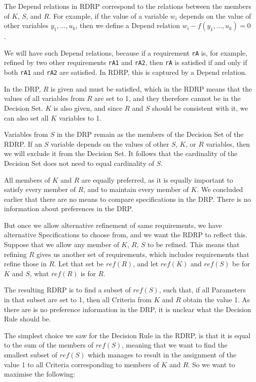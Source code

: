 \documentclass[graybox]{svmult}
\newcommand{\zi}[1]{\textit{#1}}
\newcommand{\xt}[1]{\texttt{#1}}
\newcommand{\req}[1]{\xt{#1}}
\newcommand{\ZJRP}{DRP}
\newcommand{\Specification}{Specification}
\newcommand{\Criteria}{Criteria}
\newcommand{\Parameter}{Parameter}
\newcommand{\Depend}{Depend}
\newcommand{\DecisionRule}{Decision Rule}
\newcommand{\DecisionSet}{Decision Set}
\newcommand{\ZJROP}{RDRP}
\begin{document}
The \Depend{} relations in \ZJROP{} correspond to the relations between the members of $K$, $S$, and $R$. For example, if the value of a variable $w_{i}$ depends on the value of other variables $y_{1}, \ldots, u_{k}$, then we define a \Depend{} relation $w_{i} - f(y_{1}, \ldots, u_{k}) = 0$. 

We will have such \Depend{} relations, because if a requirement \req{rA} is, for example, refined by two other requirements \req{rA1} and \req{rA2}, then \req{rA} is satisfied if and only if both \req{rA1} and \req{rA2} are satisfied. In \ZJROP, this is captured by a \Depend{} relation.

In the \ZJRP, $R$ is given and must be satisfied, which in the \ZJROP{} means that the values of all variables from $R$ are set to 1, and they therefore cannot be in the \DecisionSet. $K$ is also given, and since $R$ and $S$ should be consistent with it, we can also set all $K$ variables to 1. 

Variables from $S$ in the \ZJRP{} remain as the members of the \DecisionSet{} of the \ZJROP. If an $S$ variable depends on the values of other $S$, $K$, or $R$ variables, then we will exclude it from the \DecisionSet. It follows that the cardinality of the \DecisionSet{} does not need to equal cardinality of $S$.

All members of $K$ and $R$ are equally preferred, as it is equally important to satisfy every member of $R$, and to maintain every member of $K$. We concluded earlier that there are no means to compare specifications in the \ZJRP. There is no information about preferences in the \ZJRP.

But once we allow alternative refinement of same requirements, we have alternative \Specification s to choose from, and we want the \ZJROP{} to reflect this. Suppose that we allow any member of $K$, $R$, $S$ to be refined. This means that refining $R$ gives us another set of requirements, which includes requirements that refine those in $R$. Let that set be $\zi{ref}(R)$, and let $\zi{ref}(K)$ and $\zi{ref}(S)$ be for $K$ and $S$, what $\zi{ref}(R)$ is for $R$.

The resulting \ZJROP{} is to find a subset of $\zi{ref}(S)$, such that, if all \Parameter s in that subset are set to 1, then all \Criteria{} from $K$ and $R$ obtain the value 1. As there are is no preference information in the \ZJRP, it is unclear what the \DecisionRule{} should be.

The simplest choice we saw for the \DecisionRule{} in the \ZJROP, is that it is equal to the sum of the members of $\zi{ref}(S)$, meaning that we want to find the smallest subset of $\zi{ref}(S)$ which manages to result in the assignment of the value 1 to all \Criteria{} corresponding to members of $K$ and $R$. So we want to maximise the following:
\end{document}
